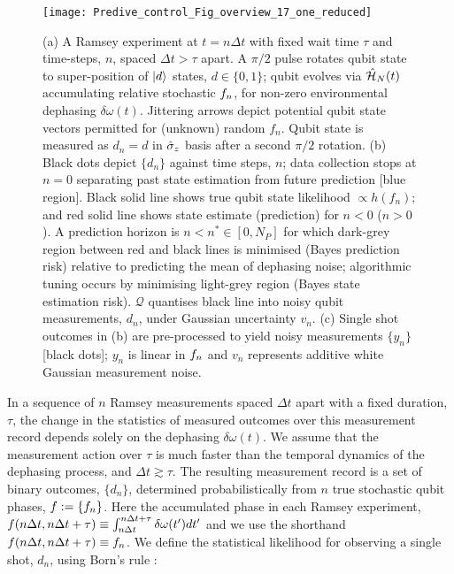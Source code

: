 \begin{figure}[h!]
	\texttt{[image: Predive\_control\_Fig\_overview\_17\_one\_reduced]} 
	\caption{ \label{fig:main:Predive_control_Fig_overview_17_one} (a) A Ramsey experiment at $t=n\Delta t$ with fixed wait time $\tau$ and time-steps, $n$, spaced $\Delta t > \tau$ apart. A $\pi/2$ pulse rotates qubit state to super-position of $| d \rangle$ states, $d\in \{0,1\}$; qubit evolves via $\hat{\mathcal{H}}_N(t)$ accumulating relative stochastic $f_n$, for non-zero environmental dephasing $\delta \omega (t)$. Jittering arrows depict potential qubit state vectors permitted for (unknown) random $f_n$. Qubit state is measured as $d_n=d$ in $\hat{\sigma}_{z}$ basis after a second $\pi/2$ rotation. (b) Black dots depict $\{d_n\}$ against time steps, $n$; data collection stops at $n=0$ separating past state estimation from future prediction [blue region].  Black solid line shows true qubit state likelihood $ \propto h(f_n)$; and  red solid line shows state estimate (prediction) for $n<0$ ($n>0$). A prediction horizon is $n < n^* \in [0,N_P]$ for which dark-grey region between red and black lines is minimised (Bayes prediction risk) relative to predicting the mean of dephasing noise; algorithmic tuning occurs by minimising light-grey region (Bayes state estimation risk). $\mathcal{Q}$ quantises black line into noisy qubit measurements, $d_n$, under Gaussian uncertainty $v_n$. (c) Single shot outcomes in (b) are pre-processed to yield noisy measurements $\{ y_n\}$ [black dots]; $y_n$ is linear in $f_n$ and $v_n$ represents additive white Gaussian measurement noise.}
\end{figure} 

In a sequence of $n$ Ramsey measurements spaced $\Delta t$ apart with a fixed duration, $\tau$, the change in the statistics of measured outcomes over this measurement record depends solely on the dephasing  $\delta \omega(t)$.   We assume that the measurement action over $\tau$ is much faster than the temporal dynamics of the dephasing process, and $\Delta t \gtrsim \tau$. The resulting measurement record is a set of binary outcomes,  $\{d_n\}$, determined probabilistically from $n$ true stochastic qubit phases, $f := \{f_n\}$. Here the accumulated phase in each Ramsey experiment, $ f(n \Delta t, n\Delta t + \tau) \equiv \int_{n \Delta t}^{n \Delta t +\tau} \delta \omega(t') dt'$ and we use the shorthand $f(n \Delta t , n\Delta t + \tau) \equiv f_n$.  We define the statistical likelihood for observing a single shot, $d_n$, using Born's rule \cite{ferrie2013}:


